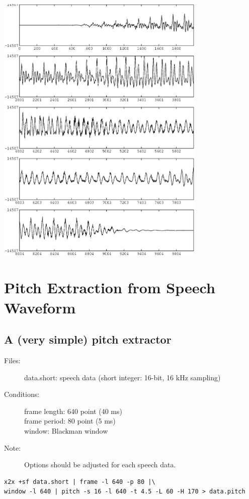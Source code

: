 \documentclass[a4paper]{article}
\begin{document}
\includegraphics[width=10cm]{data.bcut.gwave.eps}

\section{Pitch Extraction from Speech Waveform}

\subsection{A (very simple) pitch extractor}

\begin{description}
\item[Files:]
  data.short: speech data (short integer: 16-bit, 16 kHz sampling)\\
\item[Conditions:]
  frame length: 640 point (40 ms)\\
  frame period: 80 point (5 ms)\\
  window: Blackman window
\item[Note:]
  Options should be adjusted for each speech data.
\end{description}

\begin{verbatim}
x2x +sf data.short | frame -l 640 -p 80 |\
window -l 640 | pitch -s 16 -l 640 -t 4.5 -L 60 -H 170 > data.pitch
\end{verbatim}
\end{document}
